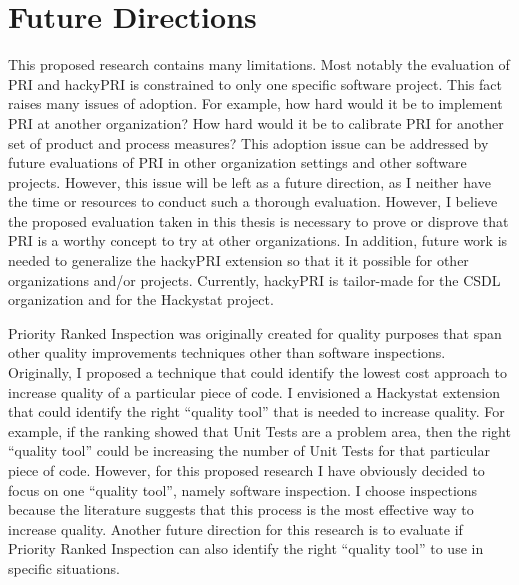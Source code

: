 
\chapter{Future Directions}
\label{chapter:contribution}

This proposed research contains many limitations. Most notably the
evaluation of PRI and hackyPRI is constrained to only one specific software
project. This fact raises many issues of adoption. For example, how hard
would it be to implement PRI at another organization? How hard would it be
to calibrate PRI for another set of product and process measures? This
adoption issue can be addressed by future evaluations of PRI in other
organization settings and other software projects. However, this issue will
be left as a future direction, as I neither have the time or resources to
conduct such a thorough evaluation. However, I believe the proposed
evaluation taken in this thesis is necessary to prove or disprove that PRI
is a worthy concept to try at other organizations. In addition, future work
is needed to generalize the hackyPRI extension so that it it possible for
other organizations and/or projects. Currently, hackyPRI is tailor-made for
the CSDL organization and for the Hackystat project.

Priority Ranked Inspection was originally created for quality purposes that
span other quality improvements techniques other than software inspections.
Originally, I proposed a technique that could identify the lowest cost
approach to increase quality of a particular piece of code.  I envisioned a
Hackystat extension that could identify the right ``quality tool'' that is
needed to increase quality. For example, if the ranking showed that Unit
Tests are a problem area, then the right ``quality tool'' could be
increasing the number of Unit Tests for that particular piece of code.
However, for this proposed research I have obviously decided to focus on
one ``quality tool'', namely software inspection. I choose inspections
because the literature suggests that this process is the most effective way
to increase quality. Another future direction for this research is to
evaluate if Priority Ranked Inspection can also identify the right
``quality tool'' to use in specific situations.







